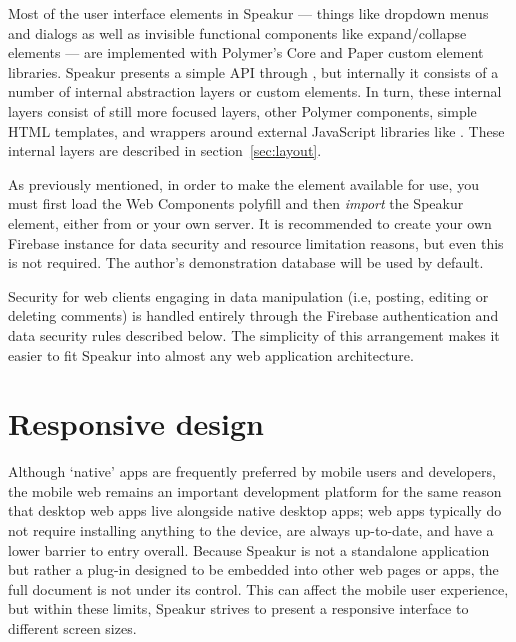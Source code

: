 Most of the user interface elements in Speakur 
--- things like dropdown menus and dialogs as well as invisible functional components like expand/collapse elements  
--- are implemented with Polymer's Core and Paper custom element libraries.
Speakur presents a simple API through ,
but internally it consists of a number of internal abstraction layers or custom elements.
In turn, these internal layers consist of still more focused layers, other Polymer components, 
simple HTML templates, 
and wrappers around external JavaScript libraries 
like .
These internal layers are described in section~\ref{sec:layout}.

As previously mentioned, in order to make the 
 element available for use, 
you must first load the Web Components polyfill and then \textit{import} the Speakur element, 
either from  or your own server.
It is recommended to create your own Firebase instance for data security and resource limitation reasons, but even this is not required. 
The author's demonstration database will be used by default.

Security for web clients engaging in data manipulation 
(i.e, posting, editing or deleting comments) 
is handled entirely through the Firebase authentication 
and data security rules described below.
The simplicity of this arrangement makes it easier to fit Speakur into almost any web application architecture.

\section{Responsive design}
\label{bg:mobile}
Although `native' apps are frequently preferred by mobile users and developers, 
the mobile web remains an important development platform for the same reason that 
desktop web apps live alongside native desktop apps; 
web apps typically do not require installing anything to the device, are always up-to-date, and have a lower barrier to entry overall.
Because Speakur is not a standalone application but rather a plug-in designed to be embedded into other web pages or apps, 
the full document is not under its control.
This can affect the mobile user experience,
but within these limits, Speakur strives to present a responsive interface to different screen sizes.

